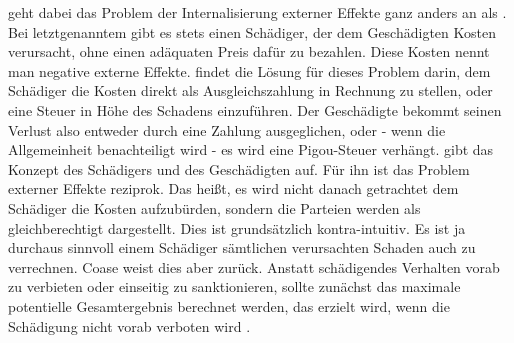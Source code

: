 \textcite{Coase1960} geht dabei das Problem der Internalisierung externer Effekte ganz anders an als \textcite{Pigou1920}. Bei letztgenanntem gibt es stets einen Schädiger, der dem Geschädigten Kosten verursacht, ohne einen adäquaten Preis dafür zu bezahlen. Diese Kosten nennt man negative externe Effekte. \textcite{Pigou1920} findet die Lösung für dieses Problem darin, dem Schädiger die Kosten direkt als Ausgleichszahlung in Rechnung zu stellen, oder eine Steuer in Höhe des Schadens einzuführen. Der Geschädigte bekommt seinen Verlust also entweder durch eine Zahlung ausgeglichen, oder - wenn die Allgemeinheit benachteiligt wird  - es wird eine Pigou-Steuer verhängt. \textcite{Coase1960} gibt das Konzept des Schädigers und des Geschädigten auf. Für ihn ist das Problem externer Effekte reziprok. Das heißt, es wird nicht danach getrachtet dem Schädiger die Kosten aufzubürden, sondern die Parteien werden als gleichberechtigt dargestellt. Dies ist grundsätzlich kontra-intuitiv. Es ist ja durchaus sinnvoll einem Schädiger sämtlichen verursachten Schaden auch zu verrechnen. Coase weist dies aber zurück. Anstatt schädigendes Verhalten vorab zu verbieten oder einseitig zu sanktionieren, sollte zunächst das maximale potentielle Gesamtergebnis berechnet werden, das erzielt wird, wenn die Schädigung nicht vorab verboten wird \parencite[S. 293]{Erlei2016}. 

